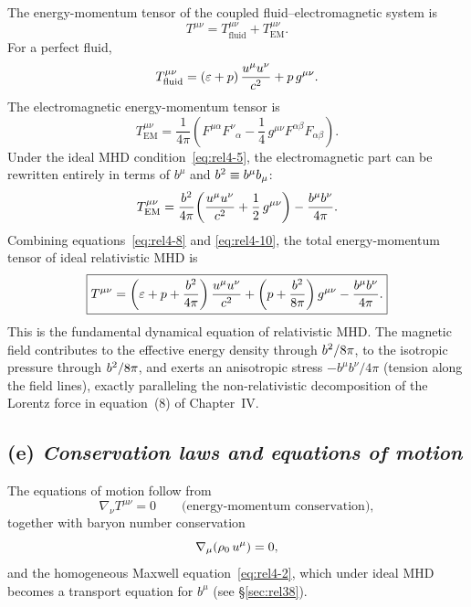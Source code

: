 The energy-momentum tensor of the coupled fluid--electromagnetic system is
\begin{equation}\label{eq:rel4-7}
  T^{\mu\nu} = T^{\mu\nu}_{\mathrm{fluid}} + T^{\mu\nu}_{\mathrm{EM}}.
\end{equation}
For a perfect fluid,
\begin{equation}\label{eq:rel4-8}
  T^{\mu\nu}_{\mathrm{fluid}} = (\varepsilon+p)\,
    \frac{u^{\mu}u^{\nu}}{c^{2}} + p\,g^{\mu\nu}.
\end{equation}
The electromagnetic energy-momentum tensor is
\begin{equation}\label{eq:rel4-9}
  T^{\mu\nu}_{\mathrm{EM}} = \frac{1}{4\pi}\!\left(
    F^{\mu\alpha}F^{\nu}{}_{\alpha}
    - \frac{1}{4}\,g^{\mu\nu}F^{\alpha\beta}F_{\alpha\beta}\right).
\end{equation}
Under the ideal MHD condition~\eqref{eq:rel4-5}, the electromagnetic part
can be rewritten entirely in terms of $b^{\mu}$ and $b^2 \equiv b^{\mu}b_{\mu}$:
\begin{equation}\label{eq:rel4-10}
  T^{\mu\nu}_{\mathrm{EM}} = \frac{b^2}{4\pi}\!\left(
    \frac{u^{\mu}u^{\nu}}{c^{2}} + \frac{1}{2}\,g^{\mu\nu}\right)
    - \frac{b^{\mu}b^{\nu}}{4\pi}.
\end{equation}
Combining equations~\eqref{eq:rel4-8} and \eqref{eq:rel4-10}, the total
energy-momentum tensor of ideal relativistic MHD is
\begin{equation}\label{eq:rel4-11}
  \boxed{
  T^{\mu\nu} = \left(\varepsilon + p + \frac{b^2}{4\pi}\right)
    \frac{u^{\mu}u^{\nu}}{c^{2}}
    + \left(p + \frac{b^2}{8\pi}\right)g^{\mu\nu}
    - \frac{b^{\mu}b^{\nu}}{4\pi}.
  }
\end{equation}
This is the fundamental dynamical equation of relativistic MHD.  The
magnetic field contributes to the effective energy density through
$b^2/8\pi$, to the isotropic pressure through $b^2/8\pi$, and exerts
an anisotropic stress $-b^{\mu}b^{\nu}/4\pi$ (tension along the field
lines), exactly paralleling the non-relativistic decomposition of the
Lorentz force in equation~(8) of Chapter~IV.

\subsection*{(e) \emph{Conservation laws and equations of motion}}

The equations of motion follow from
\begin{equation}\label{eq:rel4-12}
  \nabla_{\nu}T^{\mu\nu} = 0 \qquad \text{(energy-momentum conservation)},
\end{equation}
together with baryon number conservation
\begin{equation}\label{eq:rel4-13}
  \nabla_{\mu}(\rho_0\, u^{\mu}) = 0,
\end{equation}
and the homogeneous Maxwell equation~\eqref{eq:rel4-2}, which under ideal
MHD becomes a transport equation for $b^{\mu}$ (see \S\ref{sec:rel38}).

